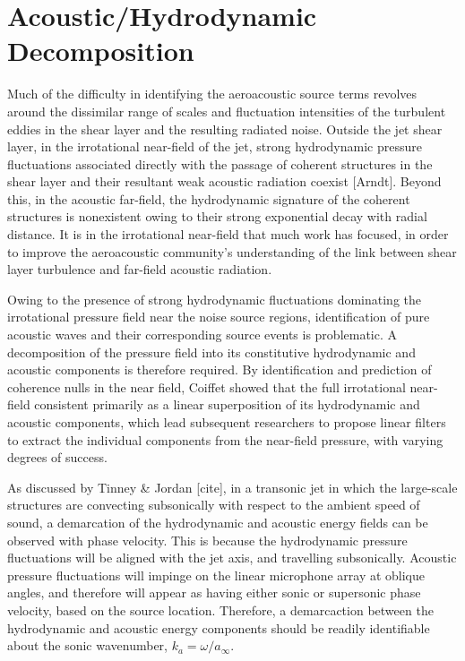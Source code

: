 \section{Acoustic/Hydrodynamic Decomposition}
Much of the difficulty in identifying the aeroacoustic source terms revolves around the dissimilar range of scales and fluctuation intensities of the turbulent eddies in the shear layer and the resulting radiated noise. 
Outside the jet shear layer, in the irrotational near-field of the jet, strong hydrodynamic pressure fluctuations associated directly with the passage of coherent structures in the shear layer and their resultant weak acoustic radiation coexist [Arndt]. 
Beyond this, in the acoustic far-field, the hydrodynamic signature of the coherent structures is nonexistent owing to their strong exponential decay with radial distance.
It is in the irrotational near-field that much work has focused, in order to improve the aeroacoustic community's understanding of the link between shear layer turbulence and far-field acoustic radiation. 

Owing to the presence of strong hydrodynamic fluctuations dominating the irrotational pressure field near the noise source regions, identification of pure acoustic waves and their corresponding source events is problematic.
A decomposition of the pressure field into its constitutive hydrodynamic and acoustic components is therefore required. 
By identification and prediction of coherence nulls in the near field, Coiffet \etal [cite] showed that the full irrotational near-field consistent primarily as a linear superposition of its hydrodynamic and acoustic components, which lead subsequent researchers to propose linear filters to extract the individual components from the near-field pressure, with varying degrees of success. 

As discussed by Tinney \& Jordan [cite], in a transonic jet in which the large-scale structures are convecting subsonically with respect to the ambient speed of sound, a demarcation of the hydrodynamic and acoustic energy fields can be observed with phase velocity.
This is because the hydrodynamic pressure fluctuations will be aligned with the jet axis, and travelling subsonically. 
Acoustic pressure fluctuations will impinge on the linear microphone array at oblique angles, and therefore will appear as having either sonic or supersonic phase velocity, based on the source location. 
Therefore, a demarcaction between the hydrodynamic and acoustic energy components should be readily identifiable about the sonic wavenumber, $k_a = \omega / a_\infty$.

